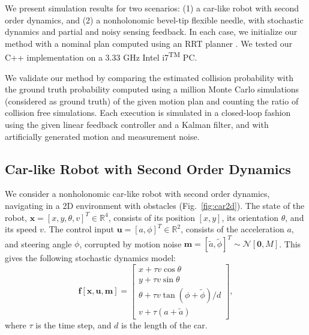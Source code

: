 
We present simulation results for two scenarios: (1) a car-like robot with second order dynamics, and (2) a nonholonomic bevel-tip flexible needle, with stochastic dynamics and partial and noisy sensing feedback. In each case, we initialize our method with a nominal plan computed using an RRT planner \cite{Book:LaValle06}. We tested our C++ implementation on a 3.33 GHz Intel\textsuperscript{\tiny \textregistered} i7\textsuperscript{\tiny TM} PC. %

We validate our method by comparing the estimated collision probability with the ground truth probability computed using a million Monte Carlo simulations (considered as ground truth) of the given motion plan and counting the ratio of collision free simulations. Each execution is simulated in a closed-loop fashion using the given linear feedback controller and a Kalman filter, and with artificially generated motion and measurement noise.

\subsection{Car-like Robot with Second Order Dynamics}

We consider a nonholonomic car-like robot with second order dynamics, navigating in a 2D environment with obstacles (Fig.\ \ref{fig:car2d}). The state of the robot, $\mathbf{x} = [x, y, \theta, v]^T \in \mathbb{R}^4$, consists of its position $[x, y]$, its orientation $\theta$, and its speed $v$. The control input $\mathbf{u} = [a, \phi]^T \in \mathbb{R}^2$, consists of the acceleration $a$, and steering angle $\phi$, corrupted by motion noise $\mathbf{m} = [\tilde{a}, \tilde{\phi}]^T \sim \mathcal{N}[\mathbf{0}, M]$. This gives the following stochastic dynamics model:
\begin{equation}
\mathbf{f}[\mathbf{x}, \mathbf{u}, \mathbf{m}] = \begin{bmatrix} x + \tau v \cos\theta \\ y + \tau v \sin \theta \\ \theta + \tau v \tan(\phi + \tilde{\phi})/d \\ v + \tau(a + \tilde{a}) \end{bmatrix},
\end{equation}
where $\tau$ is the time step, and $d$ is the length of the car.

